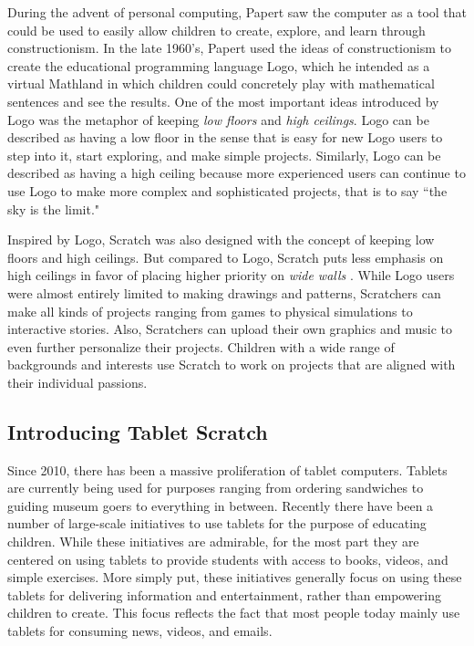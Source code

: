 During the advent of personal computing, Papert saw the computer as a tool that could be used to easily allow children to create, explore, and learn through constructionism. In the late 1960's, Papert used the ideas  of constructionism to create the educational programming language Logo, which he intended as a virtual Mathland in which children could concretely play with mathematical sentences and see the results. One of the most important ideas introduced by Logo was the metaphor of keeping \emph{low floors} and \emph{high ceilings}. Logo can be described as having a low floor in the sense that is easy for new Logo users to step into it, start exploring, and make simple projects. Similarly, Logo can be described as having a high ceiling because more experienced users can continue to use Logo to make more complex and sophisticated projects, that is to say ``the sky is the limit."

Inspired by Logo, Scratch was also designed with the concept of keeping low floors and high ceilings. But compared to Logo, Scratch puts less emphasis on high ceilings in favor of placing higher priority on \emph{wide walls} \cite{Reflections}. While Logo users were almost entirely limited to making drawings and patterns, Scratchers can make all kinds of projects ranging from games to physical simulations to interactive stories. Also, Scratchers can upload their own graphics and music to even further personalize their projects. Children with a wide range of backgrounds and interests use Scratch to work on projects that are aligned with their individual passions.

\subsection{Introducing Tablet Scratch}
Since 2010, there has been a massive proliferation of tablet computers. Tablets are currently being used for purposes ranging from ordering sandwiches to guiding museum goers to everything in between. Recently there have been a number of large-scale initiatives to use tablets for the purpose of educating children. While these initiatives are admirable, for the most part they are centered on using tablets to provide students with access to books, videos, and simple exercises. More simply put, these initiatives generally focus on using these tablets for delivering information and entertainment, rather than empowering children to create. This focus reflects the fact that most people today mainly use tablets for consuming news, videos, and emails.


